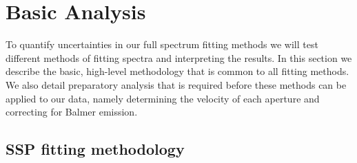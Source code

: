 \section{Basic Analysis}
\label{891_2:sec:anal}

To quantify uncertainties in our full spectrum fitting methods we will
test different methods of fitting spectra and interpreting the
results. In this section we describe the basic, high-level methodology
that is common to all fitting methods. We also detail preparatory
analysis that is required before these methods can be applied to our
data, namely determining the velocity of each aperture and correcting
for Balmer emission.



\subsection{SSP fitting methodology}
\label{891_2:sec:SSP_method}

